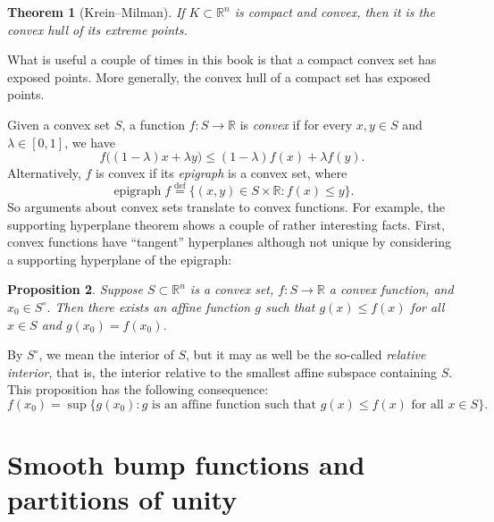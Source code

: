 \documentclass[12pt,openany]{book}
\newcommand{\R}{{\mathbb{R}}}
\newcommand{\myindex}[1]{#1\index{#1}}
\theoremstyle{plain}
\newtheorem{thm}{Theorem}[section]
\newtheorem{prop}[thm]{Proposition}
\theoremstyle{remark}
\theoremstyle{definition}
\theoremstyle{exercise}
\theoremstyle{example}
\begin{document}
\begin{thm}[Krein--Milman]
If $K \subset \R^n$ is compact and convex, then it is the convex hull of
its extreme points.
\end{thm}

What is useful a couple of times in this book is that a compact
convex set has exposed points.  More generally, the convex hull of a
compact set has exposed points.

Given a convex set $S$, a function $f \colon S \to \R$ is
\emph{convex} if
for every $x,y \in S$ and $\lambda \in [0,1]$, we have
\begin{equation*}
f\bigl((1-\lambda) x + \lambda y\bigr) \leq
(1-\lambda) f(x) + \lambda f(y) .
\end{equation*}
Alternatively, $f$ is convex if its \emph{\myindex{epigraph}}
is a convex set, where
\begin{equation*}
\operatorname{epigraph} f
\overset{\text{def}}{=}
\bigl\{ (x,y) \in S \times \R : f(x) \leq y \bigr\} .
\end{equation*}
So arguments about convex sets translate to convex functions.
For example,
the supporting hyperplane theorem shows a couple of rather interesting
facts.  First, convex functions have ``tangent'' hyperplanes although not
unique by considering a supporting hyperplane of the epigraph:

\begin{prop}
Suppose $S \subset \R^n$ is a convex set, $f \colon S \to \R$ a
convex function, and $x_0 \in S^\circ$.  Then there exists an affine function
$g$ such that $g(x) \leq f(x)$ for all $x \in S$ and $g(x_0) = f(x_0)$.
\end{prop}

By $S^\circ$, we mean the interior of $S$, but it may as well be
the so-called \emph{\myindex{relative interior}},
that is, the interior relative to the smallest
affine subspace containing $S$.
This proposition has the following consequence:
\begin{equation*}
f(x_0) = \sup \bigl\{ g(x_0) : g \text{ is an affine function such that } g(x) \leq
f(x) \text{ for all } x \in S \bigr\} .
\end{equation*}


\section{Smooth bump functions and partitions of unity} \label{apsec:partofunity}
\end{document}
